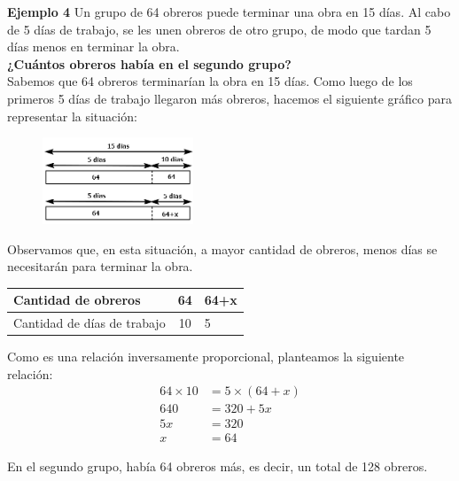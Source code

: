 {\color{brown}\textbf{Ejemplo 4}} Un grupo de 64 obreros puede terminar una obra en 15 días. Al cabo de 5 días de trabajo, se les unen obreros de otro grupo, de modo que tardan 5 días menos en terminar la obra.\\
\textbf{¿Cuántos obreros había en el segundo grupo?}\\

Sabemos que 64 obreros terminarían la obra en 15 días. Como luego de los primeros 5 días de trabajo llegaron más obreros, hacemos el siguiente gráfico para representar la situación:
\begin{figure}[H]
    \centering
    \includegraphics[width=0.4\textwidth]{./Unidad 2/Images/tableS8L103.png}
\end{figure}
Observamos que, en esta situación, a mayor cantidad de obreros, menos días se necesitarán para terminar la obra.\\
\begin{table}[H]
    \centering
    \begin{tabular}{|l|c|l|}
        \hline
        Cantidad de obreros         & 64 & 64+x \\
        \hline
        Cantidad de días de trabajo & 10 & 5    \\
        \hline
    \end{tabular}
\end{table}
Como es una relación inversamente proporcional, planteamos la siguiente relación:
\begin{align*}
    64 \times 10 & = 5 \times (64+x) \\
    640          & = 320 +5x         \\
    5x           & = 320             \\
    x            & = 64
\end{align*}

En el segundo grupo, había 64 obreros más, es decir, un total de 128 obreros.\\